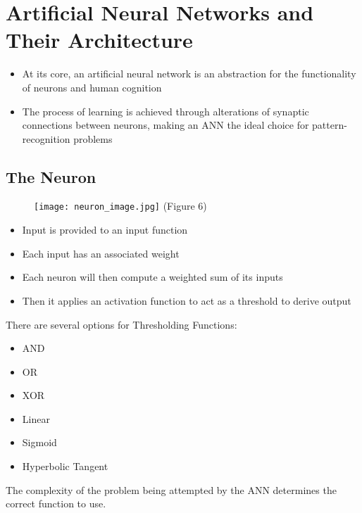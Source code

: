 \documentclass[8pt]{beamer}
\begin{document}
\section{Artificial Neural Networks and Their Architecture}
\begin{frame}
\begin{itemize}

\item At its core, an artificial neural network is an abstraction for the functionality of neurons and human cognition
\item The process of learning is achieved through alterations of synaptic connections between neurons, making an ANN the ideal choice for pattern-recognition problems
\end{itemize}
\end{frame}

\subsection{The Neuron}

\begin{frame}

\begin{figure}

	\center \texttt{[image: neuron\_image.jpg]}
	\center \tiny(Figure 6)

\end{figure}

\end{frame}

\begin{frame}

\begin{itemize}
\item Input is provided to an input function
\item Each input has an associated weight
\item Each neuron will then compute a weighted sum of its inputs 
\item Then it applies an activation function to act as a threshold to derive output
\end{itemize}

\end{frame}

\begin{frame}

There are several options for Thresholding Functions:

\begin{itemize}
\item AND
\item OR
\item XOR
\item Linear
\item Sigmoid
\item Hyperbolic Tangent 
\end{itemize}

The complexity of the problem being attempted by the ANN determines the correct function to use.

\end{frame}
\end{document}
